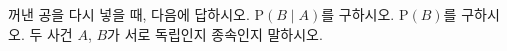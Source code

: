꺼낸 공을 다시 넣을 때, 다음에 답하시오.
 $\mathrm{P}(B\mid A)$를 구하시오.
 $\mathrm{P}(B)$를 구하시오.
 두 사건 $A$, $B$가 서로 독립인지 종속인지 말하시오.
